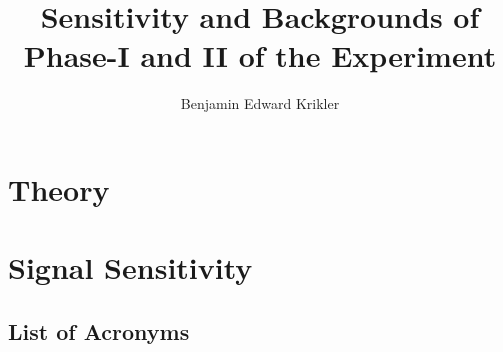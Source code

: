\documentclass{thesis}
\title{Sensitivity and Backgrounds of Phase-I and II of the \COMET Experiment}
\author{Benjamin Edward Krikler}
\begin{document}
\begin{frontmatter}
  
\end{frontmatter}

\begin{mainmatter}

	\chapter{Theory}



%
%
%


	\chapter{\phaseII Signal Sensitivity}


\end{mainmatter}

\begin{appendices}

\end{appendices}

\begin{backmatter}
\chapter{List of Acronyms}

\end{backmatter}


%

\end{document}
